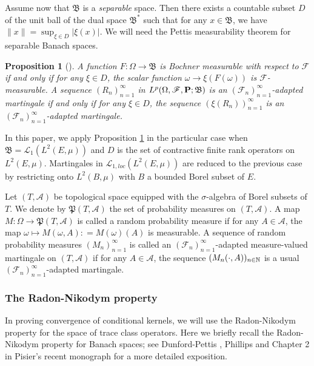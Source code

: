 \documentclass[12pt]{paper}
\newtheorem{proposition}[theorem]{Proposition}
\numberwithin{theorem}{section}
\numberwithin{figure}{section}
\numberwithin{equation}{section}
\begin{document}
    Assume  now that $\mathfrak{B}$ is a {\it separable} space. Then there exists a countable subset $D$ of the unit ball of the dual space $\mathfrak{B}^*$ such that for any $x\in \mathfrak{B}$, we have $\| x \| = \sup_{\xi \in D} | \xi (x)|$.   We will need the Pettis measurability theorem for separable Banach spaces.

   \begin{proposition}[{\cite[p. 278]{Pettis}}]\label{prop-pettis}
     A function $F: \Omega \rightarrow \mathfrak{B}$ is Bochner measurable with respect to $\mathscr{F}$ if and only if for any $\xi \in D$, the scalar function $\omega \rightarrow \xi(F(\omega))$ is $\mathscr{F}$-measurable.  A sequence $(R_n)_{n=1}^\infty$ in $L^p(\Omega, \mathscr{F}, \bold{P}; \mathfrak{B})$ is an $(\mathscr{F}_n)_{n=1}^\infty$-adapted martingale if and only if for any $\xi \in D$, the sequence $(\xi(R_n))_{n=1}^\infty$ is an $(\mathscr{F}_n)_{n=1}^\infty$-adapted martingale.
     \end{proposition}

In this paper, we  apply Proposition \ref{prop-pettis} in the particular case when $\mathfrak{B} = \mathscr{L}_1(L^2(E,\mu))$ and $D$ is the set of contractive finite rank operators on $L^2(E, \mu)$. Martingales in $\mathscr{L}_{1, loc}(L^2(E, \mu))$ are reduced to the previous case by restricting onto $L^2(B, \mu)$ with $B$ a bounded Borel subset of $E$.



Let $(T, \mathscr{A})$ be topological space equipped with the $\sigma$-algebra of Borel subsets of $T$.  We denote by $\mathfrak{P}(T, \mathscr{A})$ the set of probability measures on $(T, \mathscr{A})$.   A map $M: \Omega \rightarrow \mathfrak{P}(T, \mathscr{A})$ is called a random probability measure if for any $A\in\mathscr{A}$, the map $\omega \mapsto M(\omega, A): = M(\omega)(A)$ is measurable. A sequence of random probability measures $(M_n)_{n=1}^\infty$  is called an $(\mathscr{F}_n)_{n=1}^\infty$-adapted measure-valued martingale  on $(T, \mathscr{A})$ if for any $A \in \mathscr{A}$, the sequence $(M_n(\cdot, A))_{n\in\mathbb{N}}$ is a usual $(\mathscr{F}_n)_{n=1}^\infty$-adapted martingale.


\subsubsection{The Radon-Nikodym property}

In proving convergence of conditional kernels, we will use the Radon-Nikodym property for the space of trace class operators. Here we briefly recall the Radon-Nikodym property for Banach spaces; see Dunford-Pettis  \cite{RNP-1},  Phillips \cite{ RNP-Phillips} and Chapter 2 in Pisier's recent monograph \cite{pisier-B-martingale} for a more detailed exposition.
\end{document}
